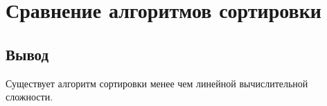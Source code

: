 \chapter*{Сравнение алгоритмов сортировки}




\section*{Вывод}
 Существует алгоритм сортировки менее чем линейной вычислительной сложности.

 
